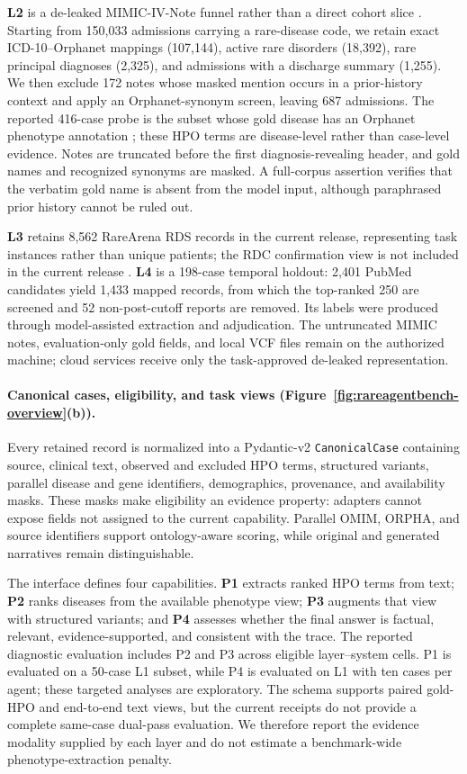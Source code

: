 \documentclass[letterpaper]{article} %
\begin{document}
\textbf{L2} is a de-leaked MIMIC-IV-Note funnel rather than a direct cohort
slice \citep{johnson2024mimiciv31}. Starting from 150,033 admissions carrying
a rare-disease code, we retain exact ICD-10--Orphanet mappings (107,144),
active rare disorders (18,392), rare principal diagnoses (2,325), and
admissions with a discharge summary (1,255). We then exclude 172 notes whose
masked mention occurs in a prior-history context and apply an
Orphanet-synonym screen, leaving 687 admissions. The reported 416-case probe
is the subset whose gold disease has an Orphanet phenotype annotation
\citep{orphadata2026nomenclature}; these HPO terms are disease-level rather
than case-level evidence. Notes are truncated before the first
diagnosis-revealing header, and gold names and recognized synonyms are
masked. A full-corpus assertion verifies that the verbatim gold name is absent
from the model input, although paraphrased prior history cannot be ruled out.

\textbf{L3} retains 8,562 RareArena RDS records in the current release,
representing task instances rather than unique patients; the RDC confirmation
view is not included in the current release \citep{chen2026rarearena}.
\textbf{L4} is a 198-case temporal holdout: 2,401 PubMed candidates yield
1,433 mapped records, from which the top-ranked 250 are screened and 52
non-post-cutoff reports are removed. Its labels were produced through
model-assisted extraction and adjudication. The untruncated MIMIC notes,
evaluation-only gold fields, and local VCF files remain on the authorized
machine; cloud services receive only the task-approved de-leaked
representation.

\paragraph{Canonical cases, eligibility, and task views
(Figure~\ref{fig:rareagentbench-overview}(b)).}
Every retained record is normalized into a Pydantic-v2
\texttt{CanonicalCase} containing source, clinical text, observed and
excluded HPO terms, structured variants, parallel disease and gene
identifiers, demographics, provenance, and availability masks. These masks
make eligibility an evidence property: adapters cannot expose fields not
assigned to the current capability. Parallel OMIM, ORPHA, and source
identifiers support ontology-aware scoring, while original and generated
narratives remain distinguishable.

The interface defines four capabilities. \textbf{P1} extracts ranked HPO
terms from text; \textbf{P2} ranks diseases from the available phenotype
view; \textbf{P3} augments that view with structured variants; and
\textbf{P4} assesses whether the final answer is factual, relevant,
evidence-supported, and consistent with the trace. The reported diagnostic
evaluation includes P2 and P3 across eligible layer--system cells. P1 is
evaluated on a 50-case L1 subset, while P4 is evaluated on L1 with ten cases
per agent; these targeted analyses are exploratory. The schema supports
paired gold-HPO and end-to-end text views, but the current receipts do not
provide a complete same-case dual-pass evaluation. We therefore report the
evidence modality supplied by each layer and do not estimate a
benchmark-wide phenotype-extraction penalty.
\end{document}

